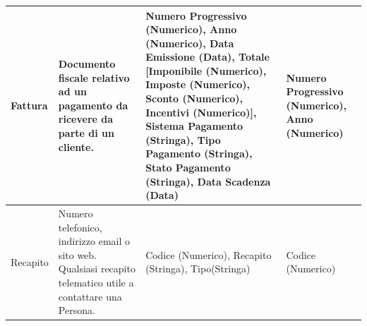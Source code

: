 {\begin{longtable}{| p{2cm} | p{4cm} | p{4cm} | p{2cm} |}
				Fattura &
				Documento fiscale relativo ad un pagamento da ricevere da parte di un cliente. &
				Numero Progressivo (Numerico), Anno (Numerico), Data Emissione (Data), Totale [Imponibile (Numerico), Imposte (Numerico), Sconto (Numerico), Incentivi (Numerico)], Sistema Pagamento (Stringa), Tipo Pagamento (Stringa), Stato Pagamento (Stringa), Data Scadenza (Data) &
				Numero Progressivo (Numerico), Anno (Numerico)
				\\ \hline
				
				Recapito &
				Numero telefonico, indirizzo email o sito web. Qualsiasi recapito telematico utile a contattare una Persona. &
				Codice (Numerico), Recapito (Stringa), Tipo(Stringa) &
				Codice (Numerico)
				\\ \hline
				
			\end{longtable}
			}

